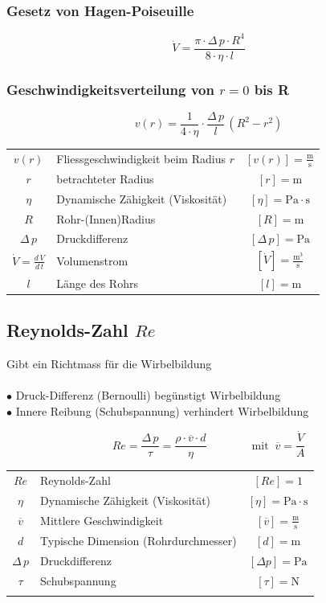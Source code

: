 \subsubsection{Gesetz von Hagen-Poiseuille}

$$ \boxed{ \dot{V} = \frac{\pi \cdot \Delta \, p \cdot R^4}{8 \cdot \eta \cdot l} } $$
 
\subsubsection{Geschwindigkeitsverteilung von $r=0$ bis R}

$$ \boxed{ v(r) = \frac{1}{4 \cdot \eta} \cdot \frac{\Delta \, p}{l} \, (R^2 - r^2) } $$



\begin{tabular}{c l c}
		\rule{0pt}{8pt}$v(r)$ & Fliessgeschwindigkeit beim Radius $r$ & $[v(r)] = \mathrm{\frac{m}{s}}$ \\
		$r$ & betrachteter Radius & $[r] = \mathrm{m}$ \\
		$\eta$ & Dynamische Zähigkeit (Viskosität) & $[\eta] = \mathrm{Pa \cdot s}$  \\
		$R$ & Rohr-(Innen)Radius & $[R] = \mathrm{m}$ \\
		$\Delta \, p$ & Druckdifferenz & $[\Delta \, p] = \mathrm{Pa}$ \\
		\rule{0pt}{8pt}$\dot{V} = \frac{d \, V}{d \, t}$ &  Volumenstrom & $[\dot{V}] = \mathrm{\frac{m^3}{s}}$	 \\
		$l$ & Länge des Rohrs & $[l] = \mathrm{m}$
\end{tabular}



\subsection{Reynolds-Zahl $Re$}
Gibt ein Richtmass für die Wirbelbildung  \\
\\
$\bullet$ Druck-Differenz (Bernoulli) begünstigt Wirbelbildung \\
$\bullet$ Innere Reibung (Schubspannung) verhindert Wirbelbildung 

$$\boxed{  Re = \frac{\Delta \, p}{\tau} = \frac{\rho \cdot \overline{v} \cdot d}{\eta} \qquad \qquad \mathrm{mit} \; \; \overline{v} = \frac{\dot{V}}{A} }  $$

	
\begin{tabular}{c l c}
		$Re$ & Reynolds-Zahl & $[Re] = 1$ \\
		$\eta$ & Dynamische Zähigkeit (Viskosität) & $[\eta] = \mathrm{Pa \cdot s}$  \\
		$\overline{v}$ & Mittlere Geschwindigkeit & $[\overline{v}] = \mathrm{\frac{m}{s}}$ \\
		$d$ & Typische Dimension (Rohrdurchmesser) & $[d] = \mathrm{m}$ \\
		$\Delta \, p$ & Druckdifferenz & $[\Delta p] = \mathrm{Pa}$ \\
		$\tau$ & Schubspannung & $[\tau] = \mathrm{N}$ \\
		\\
\end{tabular}

